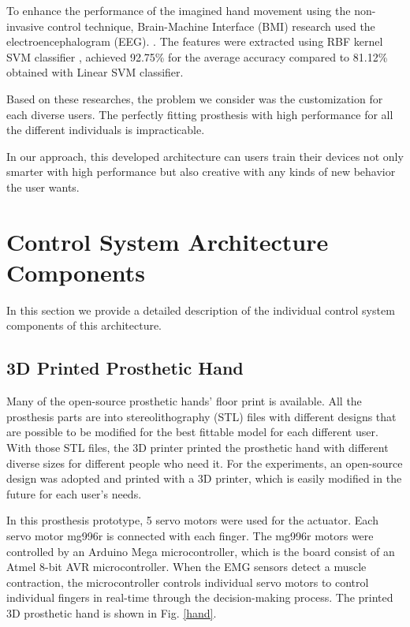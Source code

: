 \documentclass[conference]{IEEEtran}
\begin{document}
To enhance the performance of the imagined hand movement using the non-invasive control technique, Brain-Machine Interface (BMI) research used the electroencephalogram (EEG). \cite{EEG}. The features were extracted using RBF kernel SVM classifier \cite{ML1}\cite{ML2}, achieved 92.75\% for the average accuracy compared to 81.12\% obtained with Linear SVM classifier. \cite{EEG} 


Based on these researches, the problem we consider was the customization for each diverse users. The perfectly fitting prosthesis with high performance for all the different individuals is impracticable.

In our approach, this developed architecture can users train their devices not only smarter with high performance but also creative with any kinds of new behavior the user wants.


\section{Control System Architecture Components}
In this section we provide a detailed description of the individual control system components of this architecture.




\subsection{3D Printed Prosthetic Hand}
Many of the open-source prosthetic hands' floor print is available. All the prosthesis parts are into stereolithography (STL) files with different designs that are possible to be modified for the best fittable model for each different user. With those STL files, the 3D printer printed the prosthetic hand with different diverse sizes for different people who need it. For the experiments, an open-source design was adopted and printed with a 3D printer, which is easily modified in the future for each user's needs.


In this prosthesis prototype, 5 servo motors were used for the actuator. Each servo motor mg996r is connected with each finger. The mg996r motors were controlled by an Arduino Mega microcontroller, which is the board consist of an Atmel 8-bit AVR microcontroller. When the EMG sensors detect a muscle contraction, the microcontroller controls individual servo motors to control individual fingers in real-time through the decision-making process. The printed 3D prosthetic hand is shown in Fig. \ref{hand}.
\end{document}
